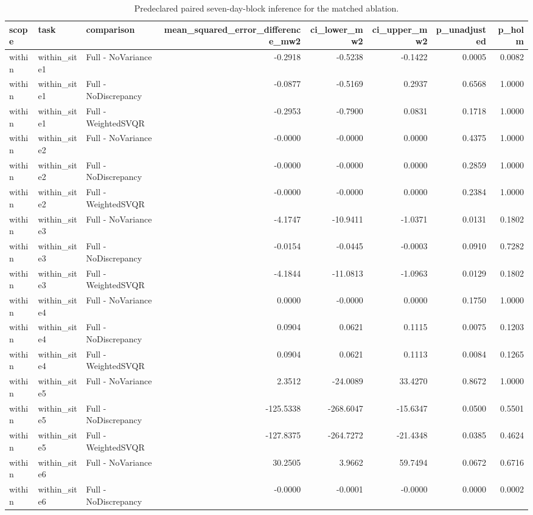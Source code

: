 \begin{table}
\caption{Predeclared paired seven-day-block inference for the matched ablation.}
\label{tab:matched_ablation_inference}
\begin{tabular}{lllrrrrr}
\toprule
scope & task & comparison & mean\_squared\_error\_difference\_mw2 & ci\_lower\_mw2 & ci\_upper\_mw2 & p\_unadjusted & p\_holm \\
\midrule
within & within\_site1 & Full - NoVariance & -0.2918 & -0.5238 & -0.1422 & 0.0005 & 0.0082 \\
within & within\_site1 & Full - NoDiscrepancy & -0.0877 & -0.5169 & 0.2937 & 0.6568 & 1.0000 \\
within & within\_site1 & Full - WeightedSVQR & -0.2953 & -0.7900 & 0.0831 & 0.1718 & 1.0000 \\
within & within\_site2 & Full - NoVariance & -0.0000 & -0.0000 & 0.0000 & 0.4375 & 1.0000 \\
within & within\_site2 & Full - NoDiscrepancy & -0.0000 & -0.0000 & 0.0000 & 0.2859 & 1.0000 \\
within & within\_site2 & Full - WeightedSVQR & -0.0000 & -0.0000 & 0.0000 & 0.2384 & 1.0000 \\
within & within\_site3 & Full - NoVariance & -4.1747 & -10.9411 & -1.0371 & 0.0131 & 0.1802 \\
within & within\_site3 & Full - NoDiscrepancy & -0.0154 & -0.0445 & -0.0003 & 0.0910 & 0.7282 \\
within & within\_site3 & Full - WeightedSVQR & -4.1844 & -11.0813 & -1.0963 & 0.0129 & 0.1802 \\
within & within\_site4 & Full - NoVariance & 0.0000 & -0.0000 & 0.0000 & 0.1750 & 1.0000 \\
within & within\_site4 & Full - NoDiscrepancy & 0.0904 & 0.0621 & 0.1115 & 0.0075 & 0.1203 \\
within & within\_site4 & Full - WeightedSVQR & 0.0904 & 0.0621 & 0.1113 & 0.0084 & 0.1265 \\
within & within\_site5 & Full - NoVariance & 2.3512 & -24.0089 & 33.4270 & 0.8672 & 1.0000 \\
within & within\_site5 & Full - NoDiscrepancy & -125.5338 & -268.6047 & -15.6347 & 0.0500 & 0.5501 \\
within & within\_site5 & Full - WeightedSVQR & -127.8375 & -264.7272 & -21.4348 & 0.0385 & 0.4624 \\
within & within\_site6 & Full - NoVariance & 30.2505 & 3.9662 & 59.7494 & 0.0672 & 0.6716 \\
within & within\_site6 & Full - NoDiscrepancy & -0.0000 & -0.0001 & -0.0000 & 0.0000 & 0.0002 \\

\end{tabular}
\end{table}
